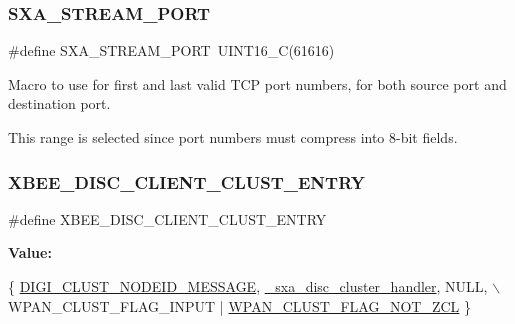 \subsubsection{\texorpdfstring{S\+X\+A\+\_\+\+S\+T\+R\+E\+A\+M\+\_\+\+P\+O\+RT}{SXA\_STREAM\_PORT}}
{\footnotesize\ttfamily \#define S\+X\+A\+\_\+\+S\+T\+R\+E\+A\+M\+\_\+\+P\+O\+RT~U\+I\+N\+T16\+\_\+C(61616)}



Macro to use for first and last valid T\+CP port numbers, for both source port and destination port. 

This range is selected since port numbers must compress into 8-\/bit fields. \mbox{\label{group___s_x_a_ga93a9155944812240b991ee57b5ef0ada}} 
\subsubsection{\texorpdfstring{X\+B\+E\+E\+\_\+\+D\+I\+S\+C\+\_\+\+C\+L\+I\+E\+N\+T\+\_\+\+C\+L\+U\+S\+T\+\_\+\+E\+N\+T\+RY}{XBEE\_DISC\_CLIENT\_CLUST\_ENTRY}}
{\footnotesize\ttfamily \#define X\+B\+E\+E\+\_\+\+D\+I\+S\+C\+\_\+\+C\+L\+I\+E\+N\+T\+\_\+\+C\+L\+U\+S\+T\+\_\+\+E\+N\+T\+RY}

{\bfseries Value\+:}
\begin{DoxyCode}
\{ \hyperlink{group__wpan__aps_gga1227ab13b41d82d9c9c9080662f74cf7ad19431fd18576cc8463e8ac362a8579c}{DIGI\_CLUST\_NODEID\_MESSAGE}, \hyperlink{group___s_x_a_ga7129f2a09a9a49d26c50cbff75e50232}{\_sxa\_disc\_cluster\_handler}, 
      NULL,      \(\backslash\)
      WPAN\_CLUST\_FLAG\_INPUT | \hyperlink{group__wpan__aps_gacb0e365a8c5e72ee90be503513e7e630}{WPAN\_CLUST\_FLAG\_NOT\_ZCL} \}
\end{DoxyCode}
\mbox{\label{group___s_x_a_ga4ef8415bf147396546ed97d7fc7ef8fd}} 
